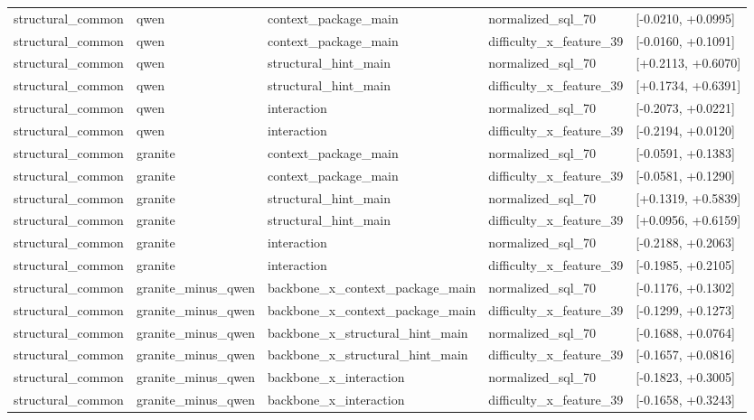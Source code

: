 \begin{tabular}{lllll}
structural\_common & qwen & context\_package\_main & normalized\_sql\_70 & [-0.0210, +0.0995] \\
structural\_common & qwen & context\_package\_main & difficulty\_x\_feature\_39 & [-0.0160, +0.1091] \\
structural\_common & qwen & structural\_hint\_main & normalized\_sql\_70 & [+0.2113, +0.6070] \\
structural\_common & qwen & structural\_hint\_main & difficulty\_x\_feature\_39 & [+0.1734, +0.6391] \\
structural\_common & qwen & interaction & normalized\_sql\_70 & [-0.2073, +0.0221] \\
structural\_common & qwen & interaction & difficulty\_x\_feature\_39 & [-0.2194, +0.0120] \\
structural\_common & granite & context\_package\_main & normalized\_sql\_70 & [-0.0591, +0.1383] \\
structural\_common & granite & context\_package\_main & difficulty\_x\_feature\_39 & [-0.0581, +0.1290] \\
structural\_common & granite & structural\_hint\_main & normalized\_sql\_70 & [+0.1319, +0.5839] \\
structural\_common & granite & structural\_hint\_main & difficulty\_x\_feature\_39 & [+0.0956, +0.6159] \\
structural\_common & granite & interaction & normalized\_sql\_70 & [-0.2188, +0.2063] \\
structural\_common & granite & interaction & difficulty\_x\_feature\_39 & [-0.1985, +0.2105] \\
structural\_common & granite\_minus\_qwen & backbone\_x\_context\_package\_main & normalized\_sql\_70 & [-0.1176, +0.1302] \\
structural\_common & granite\_minus\_qwen & backbone\_x\_context\_package\_main & difficulty\_x\_feature\_39 & [-0.1299, +0.1273] \\
structural\_common & granite\_minus\_qwen & backbone\_x\_structural\_hint\_main & normalized\_sql\_70 & [-0.1688, +0.0764] \\
structural\_common & granite\_minus\_qwen & backbone\_x\_structural\_hint\_main & difficulty\_x\_feature\_39 & [-0.1657, +0.0816] \\
structural\_common & granite\_minus\_qwen & backbone\_x\_interaction & normalized\_sql\_70 & [-0.1823, +0.3005] \\
structural\_common & granite\_minus\_qwen & backbone\_x\_interaction & difficulty\_x\_feature\_39 & [-0.1658, +0.3243] \\
\bottomrule
\end{tabular}
